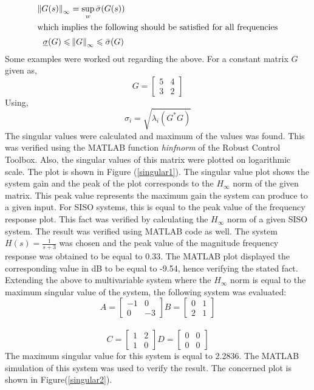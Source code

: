 \documentclass[a4paper,12pt]{article}
\newcommand\norm[1]{\left\lVert#1\right\rVert}
\begin{document}
			\begin{align}
				\norm{G(s)}_{\infty} &= \sup_{w}\bar{\sigma}(G(s))\\
				\intertext{which implies the following should be satisfied for all frequencies}
				 \underline{\sigma}(G) \leqslant &\norm{G}_{\infty} \leqslant \bar{\sigma}(G)
			\end{align}
		Some examples were worked out regarding the above. For a constant matrix $G$ given as, 
		\[G=
		\begin{bmatrix}
		5 &4\\3 & 2
		\end{bmatrix}
		\]
		Using, \begin{equation}
		\sigma_{i}=\sqrt{\lambda_{i}(G^{*}G)}
		\end{equation}
		The singular values were calculated and maximum of the values was found. This was verified using the MATLAB function \emph{hinfnorm} of the Robust Control Toolbox. Also, the singular values of this matrix were plotted on logarithmic scale. The plot is shown in Figure (\ref{singular1}).
		The singular value plot shows the system gain and the peak of the plot corresponds to the $H_{\infty}$ norm of the given matrix. This peak value represents the maximum gain the system can produce to a given input. For SISO systems, this is equal to the peak value of the frequency response plot. This fact was verified by calculating the $H_{\infty}$ norm of a given SISO system. The result was verified using MATLAB code as well. The system $H(s)=\frac{1}{s+3}$ was chosen and the peak value of the magnitude frequency response was obtained to be equal to 0.33. The MATLAB plot displayed the corresponding value in dB to be equal to -9.54, hence verifying the stated fact. \\
		Extending the above to multivariable system where the $H_{\infty}$ norm is equal to the maximum singular value of the system, the following system was evaluated:
		\[A=
		\begin{bmatrix}
		-1 & 0 \\ 0 & -3
		\end{bmatrix}
		B=
		\begin{bmatrix}
		0 & 1 \\ 2 & 1
		\end{bmatrix}
		\]
		\\
		\[C=
		\begin{bmatrix}
		1 & 2 \\ 1 & 0
		\end{bmatrix}
		D=\begin{bmatrix}
		0 & 0\\ 0 & 0		\end{bmatrix}
		\]
		The maximum singular value for this system is equal to 2.2836. The MATLAB simulation of this system was used to verify the result. The concerned plot is shown in Figure(\ref{singular2}).\\
		
\end{document}
